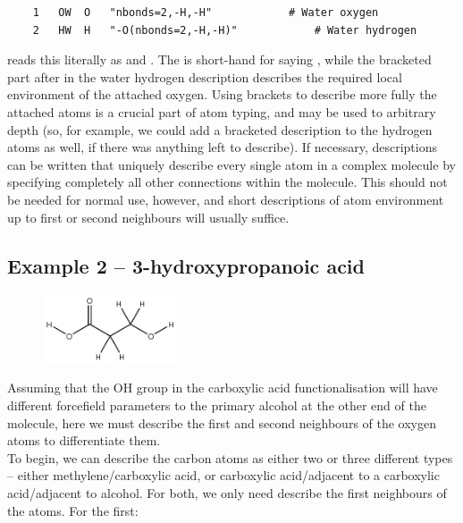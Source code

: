 \begin{verbatim}
    1	OW	O	"nbonds=2,-H,-H"			# Water oxygen
    2	HW	H	"-O(nbonds=2,-H,-H)"			# Water hydrogen
\end{verbatim}

	
\progname{} reads this literally as  and . The  is short-hand for saying , while the bracketed part after  in the water hydrogen description describes the required local environment of the attached oxygen. Using brackets to describe more fully the attached atoms is a crucial part of atom typing, and may be used to arbitrary depth (so, for example, we could add a bracketed description to the hydrogen atoms as well, if there was anything left to describe). If necessary, descriptions can be written that uniquely describe every single atom in a complex molecule by specifying completely all other connections within the molecule. This should not be needed for normal use, however, and short descriptions of atom environment up to first or second neighbours will usually suffice.\\


\subsection{Example 2 -- 3-hydroxypropanoic acid}

\begin{figure} \includegraphics[width=4cm]{images/propanoic} \end{figure}
Assuming that the OH group in the carboxylic acid functionalisation will have different forcefield parameters to the primary alcohol at the other end of the molecule, here we must describe the first and second neighbours of the oxygen atoms to differentiate them. \\

To begin, we can describe the carbon atoms as either two or three different types -- either methylene/carboxylic acid, or carboxylic acid/adjacent to a carboxylic acid/adjacent to alcohol. For both, we only need describe the first neighbours of the atoms. For the first:

